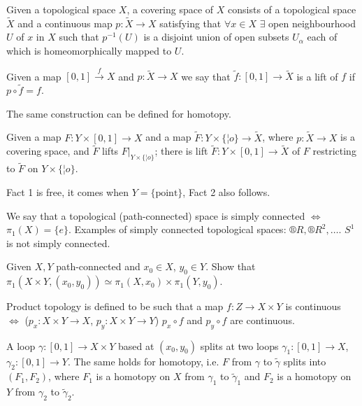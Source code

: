 \documentclass[12pt]{article}					%
\begin{document}
\begin{definice}
	Given a topological space $X$, a covering space of $X$ consists of a topological space $\tilde X$ and a continuous map $p: \tilde X \rightarrow X$ satisfying that $\forall x \in X$ $\exists$ open neighbourhood $U$ of $x$ in $X$ such that $p^{-1}(U)$ is a disjoint union of open subsets $U_α$ each of which is homeomorphically mapped to $U$.
\end{definice}

\begin{definice}
	Given a map $[0, 1] \overset{f}\rightarrow X$ and $p: \tilde X \rightarrow X$ we say that $\tilde f:[0, 1] \rightarrow \tilde X$ is a lift of $f$ if $p ∘ \tilde f = f$.

	The same construction can be defined for homotopy.
\end{definice}

\begin{tvrzeni}[*]
	Given a map $F: Y \times [0, 1] \rightarrow X$ and a map $\tilde F: Y \times \{¦o\} \rightarrow \tilde X$, where $p: \tilde X \rightarrow X$ is a covering space, and $\tilde F$ lifts $F|_{Y \times \{¦o\}}$; there is lift $\tilde F: Y \times [0, 1] \rightarrow \tilde X$ of $F$ restricting to $\tilde F$ on $Y \times \{¦o\}$.

	\begin{poznamkain}
		Fact 1 is free, it comes when $Y = \{\text{point}\}$, Fact 2 also follows.
	\end{poznamkain}
\end{tvrzeni}


\begin{priklad}
	We say that a topological (path-connected) space is simply connected $\Leftrightarrow$ $π_1(X) = \{e\}$. Examples of simply connected topological spaces: $®R, ®R^2, …$. $S^1$ is not simply connected.
\end{priklad}

\begin{priklad}
	Given $X, Y$ path-connected and $x_0 \in X$, $y_0 \in Y$. Show that $π_1(X\times Y, (x_0, y_0)) \simeq π_1(X, x_0) \times π_1(Y, y_0)$.

	\begin{reseni}
		Product topology is defined to be such that a map $f: Z \rightarrow X \times Y$ is continuous $\Leftrightarrow$ ($p_x: X\times Y \rightarrow X$, $p_y: X \times Y \rightarrow Y$) $p_x ∘ f$ and $p_y ∘ f$ are continuous.

		A loop $γ: [0, 1] \rightarrow X \times Y$ based at $(x_0, y_0)$ splits at two loops $γ_1: [0, 1] \rightarrow X$, $γ_2: [0, 1] \rightarrow Y$. The same holds for homotopy, i.e. $F$ from $γ$ to $\tilde γ$ splits into $(F_1, F_2)$, where $F_1$ is a homotopy on $X$ from $γ_1$ to $\tilde γ_1$ and $F_2$ is a homotopy on $Y$ from $γ_2$ to $\tilde γ_2$.
	\end{reseni}
\end{priklad}
\end{document}
